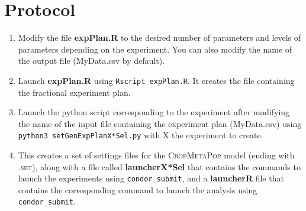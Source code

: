 \documentclass[10pt,a4paper]{article}
\begin{document}
\section{Protocol}
\begin{enumerate}
        \item Modify the file \textbf{expPlan.R} to the desired number of parameters and levels of parameters depending on the experiment. You can also modify the name of the output file (MyData.csv by default).
    \item Launch \textbf{expPlan.R} using \texttt{Rscript expPlan.R}. It creates the file containing the fractional experiment plan.
    \item Launch the python script corresponding to the experiment after modifying the name of the input file containing the experiment plan (MyData.csv) using \texttt{python3 setGenExpPlanX*Sel.py} with X the experiment to create.
    \item This creates a set of settings files for the \textsc{CropMetaPop} model (ending with \textsc{.set}), along with a file called \textbf{launcherX*Sel} that contains the commands to launch the experiments using \texttt{condor\_submit}, and a \textbf{launcherR} file that contains the corresponding command to launch the analysis using \texttt{condor\_submit}.
\end{enumerate}
\end{document}
